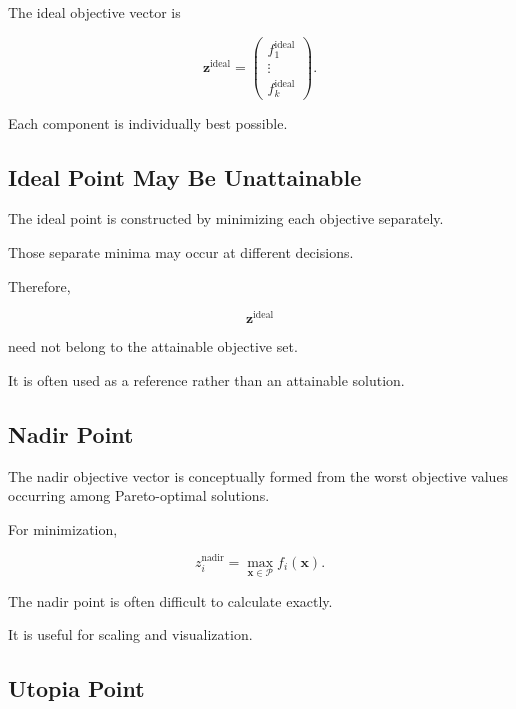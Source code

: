 The ideal objective vector is

\[
\boxed{
\mathbf{z}^{\mathrm{ideal}}
=
\begin{pmatrix}
f_1^{\mathrm{ideal}}\\
\vdots\\
f_k^{\mathrm{ideal}}
\end{pmatrix}.
}
\]

Each component is individually best possible.

\subsection{Ideal Point May Be Unattainable}
\label{subsec:ideal-point-unattainable}

The ideal point is constructed by minimizing each objective separately.

Those separate minima may occur at different decisions.

Therefore,

\[
\boxed{
\mathbf{z}^{\mathrm{ideal}}
}
\]

need not belong to the attainable objective set.

It is often used as a reference rather than an attainable solution.

\subsection{Nadir Point}
\label{subsec:nadir-point}

The nadir objective vector is conceptually formed from the worst objective
values occurring among Pareto-optimal solutions.

For minimization,

\[
\boxed{
z_i^{\mathrm{nadir}}
=
\max_{\mathbf{x}\in\mathcal{P}}
f_i(\mathbf{x}).
}
\]

The nadir point is often difficult to calculate exactly.

It is useful for scaling and visualization.

\subsection{Utopia Point}
\label{subsec:utopia-point}

